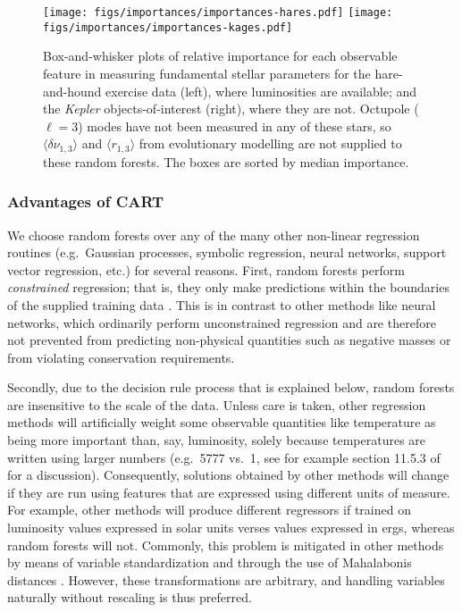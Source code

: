 \documentclass[twocolumn,twocolappendix]{aastex6}
\newif\ifref
\newcommand{\mb}[1]{\ifref\boldmath\textbf{#1}\unboldmath\else #1\fi}
\begin{document}
\begin{figure*}[!hbtp]
    \centering
    \texttt{[image: figs/importances/importances-hares.pdf]}\hfill
    \texttt{[image: figs/importances/importances-kages.pdf]}
    \caption{Box-and-whisker plots of relative importance for each observable feature in measuring fundamental stellar parameters for the hare-and-hound exercise data (left), where luminosities are available; and the \emph{Kepler} objects-of-interest (right), where they are not. Octupole ($\ell=3$) modes have not been measured in any of these stars, so $\langle\delta\nu_{1,3}\rangle$ and $\langle r_{1,3}\rangle$ from evolutionary modelling are not supplied to these random forests. The boxes are sorted by median importance.%
    \label{fig:importances2} }
\end{figure*}


\subsubsection{Advantages of CART}
We choose random forests over any of the many other non-linear regression routines (e.g.\ Gaussian processes, symbolic regression, neural networks, support vector regression, etc.) for several reasons. First, random forests perform \emph{constrained} regression; that is, they only make predictions within the boundaries of the supplied training data \citep[see e.g.][Section 9.2.1]{hastie2005elements}. This is in contrast to other methods like neural networks, which ordinarily perform unconstrained regression and are therefore not prevented from predicting non-physical quantities such as negative masses or from violating conservation requirements. 

Secondly, due to the decision rule process that is explained below, random forests are insensitive to the scale of the data. Unless care is taken, other regression methods will artificially weight some observable \mb{quantities} like temperature as being more important than, say, luminosity, solely because temperatures are written using larger numbers (e.g.\ 5777 vs.\ 1, see for example section 11.5.3 of \citealt{hastie2005elements} for a discussion). Consequently, solutions obtained by other methods will change if they are \mb{run using features that are} expressed using different units of measure. For example, other methods will produce different regressors if trained on luminosity values expressed in solar units verses values expressed in erg\mb{s}, whereas random forests will not. \mb{Commonly, this problem is mitigated in other methods by means of variable standardization and through the use of Mahalabonis distances \citep{mahalanobis1936generalized}. However, these transformations are arbitrary, and handling variables naturally without rescaling is thus preferred. } 
\end{document}
